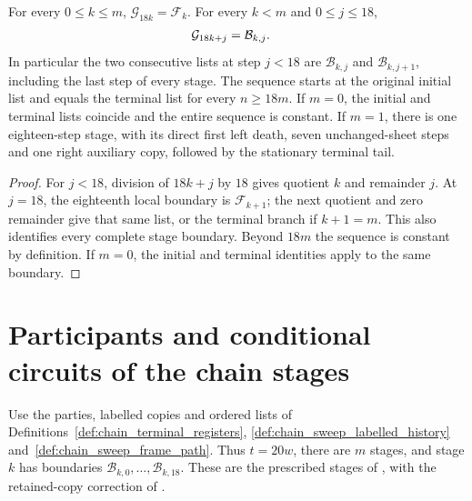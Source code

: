 \begin{lemma}
    \label{thm:chain_sweep_frame_path}
    \leanok
    For every $0\le k\le m$, $\mathcal G_{18k}=\mathcal F_k$.
    For every $k<m$ and $0\le j\le18$,
    \begin{align}
        \mathcal G_{18k+j} & =\mathcal B_{k,j}.\notag
    \end{align}
    In particular the two consecutive lists at step $j<18$ are
    $\mathcal B_{k,j}$ and $\mathcal B_{k,j+1}$, including the last
    step of every stage. The sequence starts at the original initial
    list and equals the terminal list for every $n\ge18m$.
    If $m=0$, the initial and terminal lists coincide and the entire
    sequence is constant. If $m=1$, there is one eighteen-step stage,
    with its direct first left death, seven unchanged-sheet steps and
    one right auxiliary copy, followed by the stationary terminal tail.
\end{lemma}
\begin{proof}\leanok
    For $j<18$, division of $18k+j$ by $18$ gives quotient $k$ and
    remainder $j$. At $j=18$, the eighteenth local boundary is
    $\mathcal F_{k+1}$; the next quotient and zero remainder give that
    same list, or the terminal branch if $k+1=m$.
    This also identifies every complete stage boundary. Beyond $18m$
    the sequence is constant by definition. If $m=0$, the initial and
    terminal identities apply to the same boundary.
\end{proof}

\section{Participants and conditional circuits of the chain stages}

Use the parties, labelled copies and ordered lists of
Definitions~\ref{def:chain_terminal_registers},
\ref{def:chain_sweep_labelled_history} and~\ref{def:chain_sweep_frame_path}.
Thus $t=20w$, there are $m$ stages, and stage $k$ has boundaries
$\mathcal B_{k,0},\ldots,\mathcal B_{k,18}$.
These are the prescribed stages of
\cite[Part~II, the sweep construction]{TNLean2026OneDimensional},
with the retained-copy correction of
\cite{gap:tnlean_one_dimensional_band_sweep_corrections}.

